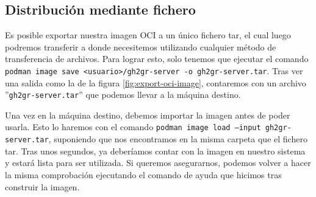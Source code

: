 \subsection{Distribución mediante fichero}
Es posible exportar nuestra imagen \acrshort{OCI} a un único fichero tar, el cual luego podremos transferir a donde necesitemos utilizando cualquier método de transferencia de archivos. Para lograr esto, solo tenemos que ejecutar el comando \texttt{podman image save <usuario>/gh2gr-server -o gh2gr-server.tar}. Tras ver una salida como la de la figura \ref{fig:export-oci-image}, contaremos con un archivo ''{\tt gh2gr-server.tar}'' que podemos llevar a la máquina destino.

Una vez en la máquina destino, debemos importar la imagen antes de poder usarla. Esto lo haremos con el comando \texttt{podman image load --input gh2gr-server.tar}, suponiendo que nos encontramos en la misma carpeta que el fichero tar. Tras unos segundos, ya deberíamos contar con la imagen en nuestro sistema y estará lista para ser utilizada. Si queremos asegurarnos, podemos volver a hacer la misma comprobación ejecutando el comando de ayuda que hicimos tras construir la imagen.

